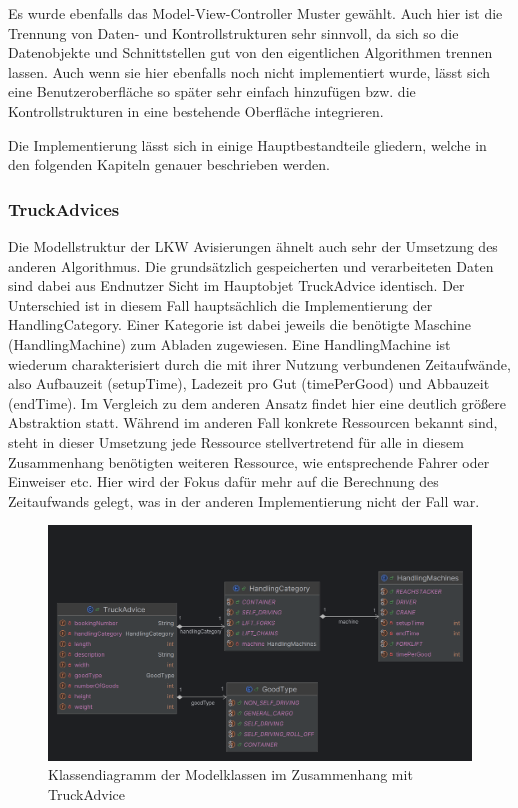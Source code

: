 Es wurde ebenfalls das Model-View-Controller Muster gewählt. Auch hier ist die Trennung von Daten- und Kontrollstrukturen sehr sinnvoll, da sich so die Datenobjekte und Schnittstellen gut von den eigentlichen Algorithmen trennen lassen. Auch wenn sie hier ebenfalls noch nicht implementiert wurde, lässt sich eine Benutzeroberfläche so später sehr einfach hinzufügen bzw. die Kontrollstrukturen in eine bestehende Oberfläche integrieren. 

Die Implementierung lässt sich in einige Hauptbestandteile gliedern, welche in den folgenden Kapiteln genauer beschrieben werden.

\subsubsection{TruckAdvices}

Die Modellstruktur der LKW Avisierungen ähnelt auch sehr der Umsetzung des anderen Algorithmus. Die grundsätzlich gespeicherten und verarbeiteten Daten sind dabei aus Endnutzer Sicht im Hauptobjet TruckAdvice identisch. Der Unterschied ist in diesem Fall hauptsächlich die Implementierung der HandlingCategory. Einer Kategorie ist dabei jeweils die benötigte Maschine (HandlingMachine) zum Abladen zugewiesen. Eine HandlingMachine ist wiederum charakterisiert durch die mit ihrer Nutzung verbundenen Zeitaufwände, also Aufbauzeit (setupTime), Ladezeit pro Gut (timePerGood) und Abbauzeit (endTime). Im Vergleich zu dem anderen Ansatz findet hier eine deutlich größere Abstraktion statt. Während im anderen Fall konkrete Ressourcen bekannt sind, steht in dieser Umsetzung jede Ressource stellvertretend für alle in diesem Zusammenhang benötigten weiteren Ressource, wie entsprechende Fahrer oder Einweiser etc. Hier wird der Fokus dafür mehr auf die Berechnung des Zeitaufwands gelegt, was in der anderen Implementierung nicht der Fall war. 

\begin{figure}[H]
    \centering
    \includegraphics[width=\textwidth]{images/classDiagrams/TSP_TruckAdvice_ClassDiagram.png}
    \caption{Klassendiagramm der Modelklassen im Zusammenhang mit TruckAdvice}
    \label{fig:tspClassDiagramTruckAvice}
\end{figure}


